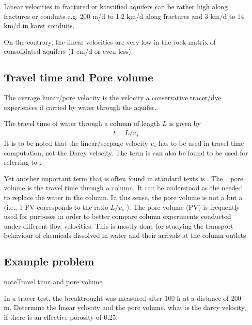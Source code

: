 \documentclass[letterpaper,10pt,english]{jupyterBook}
\begin{document}
\sphinxAtStartPar
Linear velocities in fractured or
karstified aquifers can be rather high along fractures or conduits e.g. 200 m/d to 1.2
km/d along fractures and 3 km/d to 14 km/d in karst conduits.

\sphinxAtStartPar
On the contrary, the
linear velocities are very low in the rock matrix of consolidated aquifers (1 cm/d or
even less).


\subsection{Travel time and Pore volume}
\label{\detokenize{content/flow/L4/14_darcy_law_K:travel-time-and-pore-volume}}
\sphinxAtStartPar
The average linear/pore velocity is the velocity a conservative tracer/dye experiences if
carried by water through the aquifer.

\sphinxAtStartPar
The travel time of water through a column of
length \(L\) is given by
\begin{equation*}
\begin{split}
t = L/v_s
\end{split}
\end{equation*}
\sphinxAtStartPar
It is to be noted that the linear/seepage velocity \(v_s\) has to be used in travel time computation, not the Darcy velocity. The term  is can also be found to be used for referring to  .

\sphinxAtStartPar
Yet another important term that is often found in standard texts is . The \_pore volume is the travel time through a column. It can be understood as the  needed to replace the water in the column. In this sense, the pore volume is not a  but a  (i.e., 1 PV corresponds to the ratio \(L/v_s\) ). The pore volume (PV) is frequently used for  purposes in order to better compare column
experiments conducted under different flow velocities. This is mostly done for studying the transport behaviour of chemicals dissolved in water and their arrivals at the column outlets


\subsection{Example problem}
\label{\detokenize{content/flow/L4/14_darcy_law_K:id7}}
\begin{sphinxadmonition}{note}{Travel time and pore volume}

\sphinxAtStartPar
In a tracer test, the breaktrought was measured after 100 h at a distance of 200 m. Determine the linear velocity and the pore volume. what is the darcy velocity, if there is an effective porosity of 0.25.
\end{sphinxadmonition}
\end{document}
